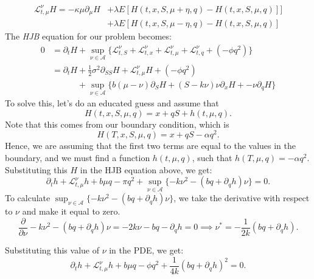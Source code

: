 \begin{align*}
	\mathcal L^\nu_{t,\mu} H  =
  -\kappa \mu \partial_\mu H &+ \lambda E[H(t,x,S,\mu+\eta, q)-H(t,x,S,\mu, q)]]\\
                             &+
	\lambda E[H(t,x,S,\mu-\eta, q)-H(t,x,S,\mu, q)]
\end{align*}
The \textit{HJB} equation for our problem becomes:
\begin{align*}
  0 &= \partial_t H +
	\sup_{\nu \in \mathcal A}\{
	\mathcal L^\nu_{t,S}+
	\mathcal L^\nu_{t,x}+
	\mathcal L^\nu_{t,\mu}+
	\mathcal L^\nu_{t,q}+
(-\phi q^2) \}
  \\& =
  \partial_t H + \frac{1}{2} \sigma^2 \partial_{SS} H + \mathcal L ^\nu_{t,\mu} H +(-\phi q^2)
  \\&\quad \quad \quad+
	\sup_{\nu \in \mathcal A}\{
	b(\mu-\nu) \partial_S H  +
	(S-k\nu) \nu \partial_x H +
	-\nu \partial_q H
	\}
\end{align*}
To solve this, let's do an educated guess and assume that
\begin{displaymath}
	H(t,x,S,\mu,q) = x + qS + h(t,\mu,q).
\end{displaymath}
Note that this comes from our boundary condition,
which is
\begin{displaymath}
  H(T,x,S,\mu,q) = x + qS - \alpha q^2.
\end{displaymath}
Hence, we are assuming that the first two terms are equal to the values in the boundary,
and we must find a function
$h(t,\mu,q)$, such that $h(T,\mu,q) = -\alpha q^2$.
Substituting this $H$ in the HJB equation above, we get:
\begin{displaymath}
	\partial_t h + \mathcal L^\nu_{t,\mu} h + b \mu q - \pi q^2 +
	\sup_{\nu \in \mathcal A} \{
	-k\nu^2 - (bq + \partial_q h)\nu
	\} = 0.
\end{displaymath}
To calculate $\sup_{\nu \in \mathcal A} \{-k\nu^2 - (bq + \partial_q h)\nu\}$,
we take the derivative with respect to $\nu$ and make it equal to zero.
\begin{displaymath}
	\frac{\partial}{\partial \nu}-k\nu^2 - (bq + \partial_q h)\nu  = - 2k\nu - bq - \partial_q h = 0 \implies
	\nu^* = -\frac{1}{2k}(bq + \partial_q h).
\end{displaymath}

Substituting this value of $\nu$ in the PDE, we get:
\begin{displaymath}
	\partial_t h + \mathcal L ^\nu_{t,\mu} h + b \mu q - \phi q^2 + \frac{1}{4k}(bq + \partial_q h)^2 =0.
\end{displaymath}

